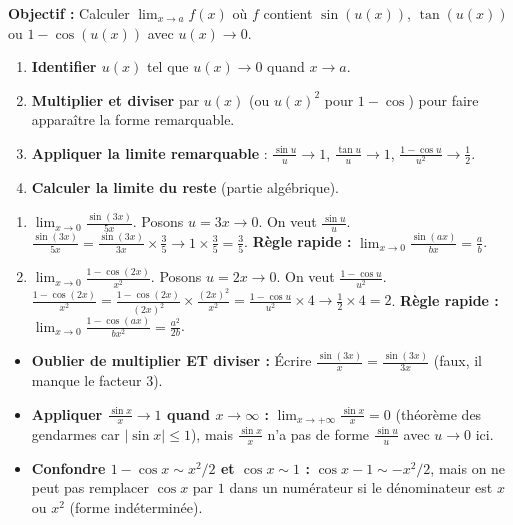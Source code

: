 \documentclass[11pt]{article}
\begin{document}
\begin{methode}
\textbf{Objectif :} Calculer $\lim_{x \to a} f(x)$ où $f$ contient $\sin(u(x))$, $\tan(u(x))$ ou $1-\cos(u(x))$ avec $u(x) \to 0$.
\begin{enumerate}
    \item \textbf{Identifier $u(x)$} tel que $u(x) \to 0$ quand $x \to a$.
    \item \textbf{Multiplier et diviser} par $u(x)$ (ou $u(x)^2$ pour $1-\cos$) pour faire apparaître la forme remarquable.
    \item \textbf{Appliquer la limite remarquable} : $\frac{\sin u}{u} \to 1$, $\frac{\tan u}{u} \to 1$, $\frac{1-\cos u}{u^2} \to \frac{1}{2}$.
    \item \textbf{Calculer la limite du reste} (partie algébrique).
\end{enumerate}
\end{methode}

\begin{exemplebox}
\begin{enumerate}
    \item $\lim_{x \to 0} \frac{\sin(3x)}{5x}$.
        Posons $u = 3x \to 0$. On veut $\frac{\sin u}{u}$.
        $\frac{\sin(3x)}{5x} = \frac{\sin(3x)}{3x} \times \frac{3}{5} \to 1 \times \frac{3}{5} = \boxed{\frac{3}{5}}$.
        \textbf{Règle rapide :} $\lim_{x \to 0} \frac{\sin(ax)}{bx} = \frac{a}{b}$.
    \item $\lim_{x \to 0} \frac{1-\cos(2x)}{x^2}$.
        Posons $u = 2x \to 0$. On veut $\frac{1-\cos u}{u^2}$.
        $\frac{1-\cos(2x)}{x^2} = \frac{1-\cos(2x)}{(2x)^2} \times \frac{(2x)^2}{x^2} = \frac{1-\cos u}{u^2} \times 4 \to \frac{1}{2} \times 4 = \boxed{2}$.
        \textbf{Règle rapide :} $\lim_{x \to 0} \frac{1-\cos(ax)}{bx^2} = \frac{a^2}{2b}$.
\end{enumerate}
\end{exemplebox}

\begin{attention}
\begin{itemize}
    \item \textbf{Oublier de multiplier ET diviser :} Écrire $\frac{\sin(3x)}{x} = \frac{\sin(3x)}{3x}$ (faux, il manque le facteur $3$).
    \item \textbf{Appliquer $\frac{\sin x}{x} \to 1$ quand $x \to \infty$ :} $\lim_{x \to +\infty} \frac{\sin x}{x} = 0$ (théorème des gendarmes car $|\sin x| \le 1$), mais $\frac{\sin x}{x}$ n'a pas de forme $\frac{\sin u}{u}$ avec $u\to 0$ ici.
    \item \textbf{Confondre $1-\cos x \sim x^2/2$ et $\cos x \sim 1$ :} $\cos x - 1 \sim -x^2/2$, mais on ne peut pas remplacer $\cos x$ par $1$ dans un numérateur si le dénominateur est $x$ ou $x^2$ (forme indéterminée).
\end{itemize}
\end{attention}
\end{document}
